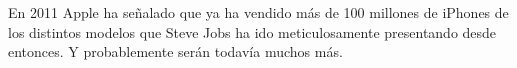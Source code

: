 \documentclass[notumble,10pt,a4paper]{leaflet}
\begin{document}
	En 2011 Apple ha señalado que ya ha vendido más de 100 millones de iPhones de los distintos modelos que Steve Jobs ha ido meticulosamente presentando desde entonces. Y probablemente serán todavía muchos más.




{}

\end{document}
